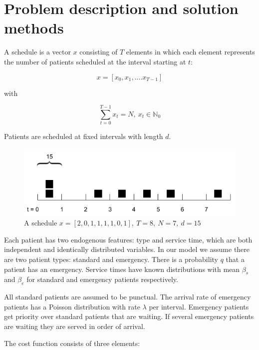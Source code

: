 \documentclass[
  10pt,
  letterpaper,
]{article}
\begin{document}
\hypertarget{problem-description-and-solution-methods}{%
\section{Problem description and solution
methods}\label{problem-description-and-solution-methods}}

A schedule is a vector \(x\) consisting of \(T\) elements in which each
element represents the number of patients scheduled at the interval
starting at \(t\):

\[
x = [x_0, x_1, ....x_{T-1}]
\]

with

\[
\displaystyle\sum_{t=0} ^{T-1} x_t = N,\ x_t \in \mathbb{N}_0
\]

Patients are scheduled at fixed intervals with length \(d\).

\begin{figure}

{\centering \includegraphics{images/schedule.png}

}

\caption{A schedule
\(x = [2, 0, 1, 1, 1, 1, 0, 1],\ T = 8,\ N = 7,\ d = 15\)}

\end{figure}

Each patient has two endogenous features: type and service time, which
are both independent and identically distributed variables. In our model
we assume there are two patient types: standard and emergency. There is
a probability \(q\) that a patient has an emergency. Service times have
known distributions with mean \(\beta_s\) and \(\beta_e\) for standard
and emergency patients respectively.

All standard patients are assumed to be punctual. The arrival rate of
emergency patients has a Poisson distribution with rate \(\lambda\) per
interval. Emergency patients get priority over standard patients that
are waiting. If several emergency patients are waiting they are served
in order of arrival.

The cost function consists of three elements:
\end{document}
